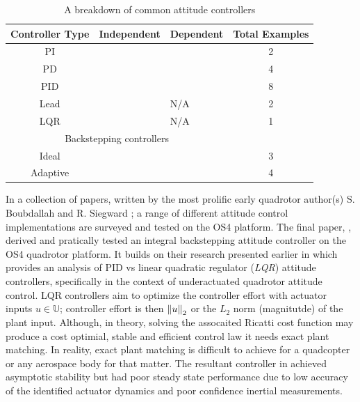 \begin{table}[h]
\centering
\begin{tabular}{ |c|l|l|c| }
\hline
Controller Type & Independent & Dependent & Total Examples\\ \hline
PI & \cite{attitudecontrolproblem} & \cite{attitudecontrolproblem} & 2\\ \hline
PD & \cite{modelingquadcopter, tiltrihani} & \cite{fullquaternion,singleaxistilting} & 4\\ \hline
PID & \cite{optimizedpidquadcopter, attitudecontrolproblem, quaddynamics, tiltpropellercontrol, pidlqr} & \cite{attitudecontrolproblem, starmac, adaptivedisturbancecontrol} & 8\\ \hline
Lead & \cite{x4flyer, dynamicmodelling2009} & N/A & 2\\ \hline
LQR & \cite{pidlqr} & N/A & 1\\ 
\hline
\multicolumn{3}{|c|}{Backstepping controllers} & \\
\hline
Ideal & \cite{tpheonix, backsteppingquadcoptercontrol} & \cite{backsteppingquadcoptercontrol} & 3\\ \hline
Adaptive & \multicolumn{2}{l|}{\cite{adaptivebackstep, nonlinearadaptive, 6dofbackstep, intelligentbackstep}} & 4\\ \hline
\end{tabular}
\caption{A breakdown of common attitude controllers}
\label{tab:controllers}
\end{table}
\par
\vspace{-15pt}
In a collection of papers, written by the most prolific early quadrotor author(s) S. Boubdallah and R. Siegward \cite{pidlqr,indoorslidingmode, fullquadcoptercontrol}; a range of different attitude control implementations are surveyed and tested on the OS4 platform. The final paper, \cite{fullquadcoptercontrol}, derived and pratically tested an integral backstepping attitude controller on the OS4 quadrotor platform. It builds on their research presented earlier in \cite{pidlqr} which provides an analysis of PID vs linear quadratic regulator (\emph{LQR}) attitude controllers, specifically in the context of underactuated quadrotor attitude control. LQR controllers aim to optimize the controller effort with actuator inputs $u\in\mathbb{U}$; controller effort is then $\left\lVert u\right\rVert_2$ or the $L_2$ norm (magnitutde) of the plant input. Although, in theory, solving the assocaited Ricatti cost function may produce a cost optimial, stable and efficient control law it needs exact plant matching. In reality, exact plant matching is difficult to achieve for a quadcopter or any aerospace body for that matter. The resultant controller in \cite{pidlqr} achieved asymptotic stability but had poor steady state performance due to low accuracy of the identified actuator dynamics and poor confidence inertial measurements.
